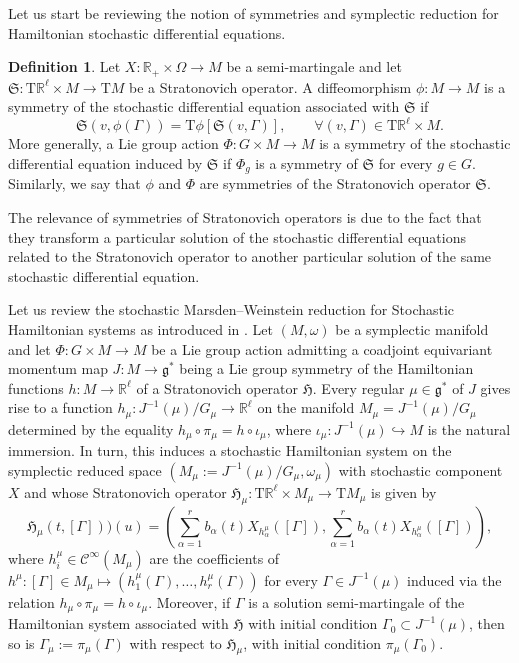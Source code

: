 \documentclass[11pt]{article}
\theoremstyle{plain}
\theoremstyle{definition}
\newtheorem{definition}[theorem]{Definition}
\newcommand{\Cinfty}{\mathscr{C}^\infty}
\newcommand{\T}{\mathrm{T}}
\begin{document}
Let us start be reviewing the notion of symmetries and symplectic reduction for Hamiltonian stochastic differential equations. 

\begin{definition}
Let $X:\mathbb{R}_+\times \Omega\rightarrow M$ be a semi-martingale and let $\mathfrak{S}:\T\mathbb{R}^\ell\times M\rightarrow \T M$ be a Stratonovich operator. A diffeomorphism $\phi:M\rightarrow M$ is a symmetry of the stochastic differential equation associated with $\mathfrak{S}$ if
$$
\mathfrak{S}(v,\phi (\Gamma))=\T\phi [\mathfrak{S}(v,\Gamma)],\qquad \forall (v,\Gamma)\in \T \mathbb{R}^\ell\times M.
$$
More generally, a Lie group action $\Phi:G\times M\rightarrow M$ is a symmetry of  the stochastic differential equation induced by $\mathfrak{S}$ if $\Phi_g$ is a symmetry of $\mathfrak{S}$ for every $g\in G$. Similarly, we say that $\phi$ and $\Phi$ are symmetries of the Stratonovich operator $\mathfrak{S}$.     
\end{definition}

The relevance of symmetries of Stratonovich operators is due to the fact that they transform a particular solution of the stochastic differential equations related to the Stratonovich operator to another particular solution of the same stochastic differential equation.

Let us review the stochastic Marsden--Weinstein reduction for Stochastic Hamiltonian systems as introduced in  \cite{LO9Red}. 
 Let  $(M,\omega)$ be a symplectic manifold and let $\Phi:G\times M\rightarrow M$ be a Lie group action  admitting a coadjoint equivariant momentum map $J : M \rightarrow \mathfrak{g}^*$ being a Lie group symmetry of the Hamiltonian functions $h:M\rightarrow \mathbb{R}^\ell$ of a Stratonovich operator $\mathfrak{H}
$. Every  regular $\mu\in \mathfrak{g}^*$ of $J$ gives rise to a   function  $h_\mu  :  J^{-1}(\mu)/G_\mu \rightarrow \mathbb{R}^\ell$ on the manifold $M_\mu=J^{-1}(\mu)/G_\mu$
determined by the equality $h_\mu\circ \pi_\mu=h\circ \iota_\mu$, where $\iota_\mu:J^{-1}(\mu)\hookrightarrow M$ is the natural immersion. In turn, this induces a stochastic Hamiltonian
system on the symplectic reduced space $(M_\mu := J^{-1}(\mu)/G_\mu, \omega_\mu)$ with stochastic
component $X$ and whose Stratonovich operator $\mathfrak{H}_\mu : \T \mathbb{R}^\ell \times M_\mu \to \T M_\mu$ is
given by
$$
\mathfrak{H}_\mu(t, [\Gamma]))(u) = \left(\sum_{\alpha=1}^rb_\alpha(t)X_{h^\mu_\alpha}([\Gamma]),\sum_{\alpha=1}^rb_\alpha(t)X_{h^\mu_\alpha}([\Gamma])\right),
$$
where
$h^\mu_i \in\Cinfty(M_\mu)$ are the coefficients of $h^\mu:[\Gamma]\in M_\mu\mapsto (h^\mu_1(\Gamma),\ldots,h^\mu_r(\Gamma))$ for every $\Gamma\in J^{-1}(\mu)$ induced  via the relation $h_\mu \circ \pi_\mu = h \circ \iota_\mu$. Moreover, if $\Gamma$ is a solution semi-martingale of the Hamiltonian
system associated with $\mathfrak{H}$ with initial condition $\Gamma_0\subset J^{-1}(\mu)$, then so is $\Gamma_\mu := \pi_\mu(\Gamma)$
with respect to $\mathfrak{H}_\mu$, with initial condition $\pi_\mu(\Gamma_0)$.
\end{document}
